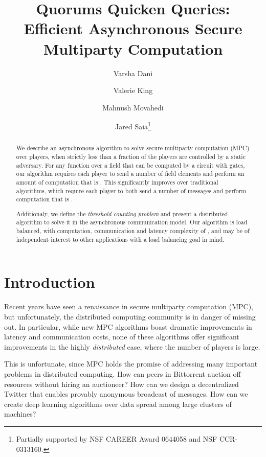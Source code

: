\documentclass[10pt]{llncs}
\begin{document}
\title{Quorums Quicken Queries: Efficient Asynchronous Secure Multiparty Computation}
\author{
Varsha Dani
\and Valerie King 
\and Mahnush Movahedi
\and Jared Saia\thanks{Partially supported by NSF
CAREER Award 0644058 and NSF CCR-0313160.}
}
\maketitle







\begin{abstract}
We describe an asynchronous algorithm to solve secure multiparty
computation (MPC) over  players, when strictly less than a 
fraction of the players are controlled by a static adversary.  For any
function  over a field that can be computed by a circuit with  gates, our
algorithm requires each player to send a number of field elements and perform an
amount of computation that is . This
significantly improves over traditional algorithms, which require each
player to both send a number of messages and perform computation that
is .

Additionaly, we define the \emph{threshold counting problem} and
present a distributed algorithm to solve it in the asynchronous
communication model.  Our algorithm is load balanced, with
computation, communication and latency complexity of , and
may be of independent interest to other applications with a load
balancing goal in mind.
\end{abstract}

\section{Introduction}


Recent years have seen a renaissance in secure multiparty computation (MPC), but unfortunately, the distributed computing community is in danger of missing out.  In particular,  while new MPC algorithms boast dramatic improvements in latency and communication costs, none of these algorithms offer significant improvements in the highly \emph{distributed} case, where the number of players is large.  

This is unfortunate, since MPC holds the promise of addressing many important problems in distributed computing. How can peers in Bittorrent auction off resources without hiring an auctioneer?  How can we design a decentralized Twitter that enables provably anonymous broadcast of messages.  How can we create deep learning algorithms over data spread among large clusters of machines?
\end{document}

